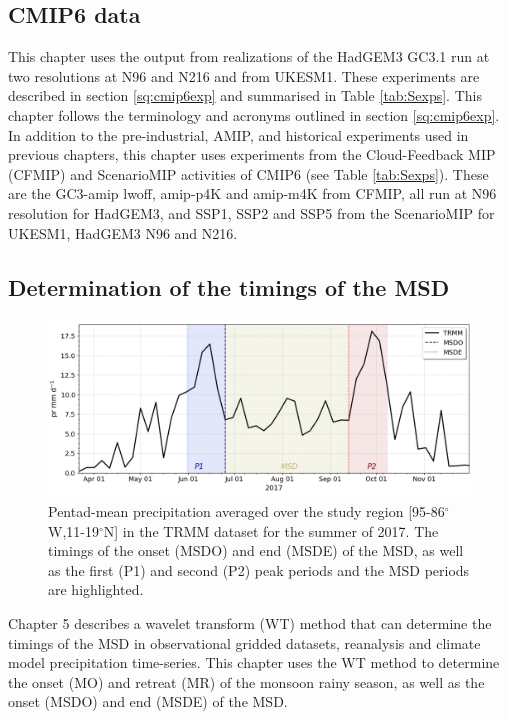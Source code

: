 \subsection{CMIP6 data}\label{sq:ch6cmipdata}

This chapter uses the output from realizations of the HadGEM3 GC3.1 run at two resolutions at N96 and N216 and from UKESM1. These experiments are described in section \ref{sq:cmip6exp} and summarised in Table \ref{tab:Sexps}. This chapter follows the terminology and acronyms outlined in section \ref{sq:cmip6exp}. In addition to the pre-industrial, AMIP, and historical experiments used in previous chapters, this chapter uses experiments from the Cloud-Feedback MIP (CFMIP) \citep{webb2017} and ScenarioMIP \citep{o2016} activities of CMIP6 (see Table \ref{tab:Sexps}). These are the GC3-amip lwoff, amip-p4K and amip-m4K from CFMIP, all run at N96 resolution for HadGEM3, and SSP1, SSP2 and SSP5 from the ScenarioMIP for UKESM1, HadGEM3 N96 and N216.

\subsection{Determination of the timings of the MSD}

 \begin{figure}[t!]
\includegraphics[width=\linewidth]{figures/explain_fig_msd.png}
\caption[Illustration of the use of the wavelet transform method]{Pentad-mean precipitation averaged over the study region [95-86$^\circ$W,11-19$^\circ$N] in the TRMM dataset for the summer of 2017. The timings of the onset (MSDO) and end (MSDE) of the MSD, as well as the first (P1) and second (P2) peak periods and the MSD periods are highlighted. }
\label{fig:explain_msd}
\end{figure}

Chapter 5 describes a wavelet transform (WT) method that can determine the timings of the MSD in observational gridded datasets, reanalysis and climate model precipitation time-series. 
This chapter uses the WT method to determine the onset (MO) and retreat (MR) of the monsoon rainy season, as well as the onset  (MSDO) and end (MSDE) of the MSD. 

